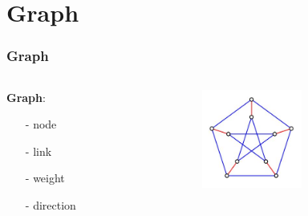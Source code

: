 \documentclass[notheorems,mathserif,table,compress]{beamer}  %
\begin{document}
\section{Graph}
\begin{frame}
    \frametitle{Graph}
    \begin{columns}
       \begin{column}[c]{0.5\textwidth}
          {\textbf{\Large Graph}}:\\
          \begin{itemize}
	  \item[-] node
	  \item[-] link
	  \item[-] weight
	  \item[-] direction
          \end{itemize}
      \end{column}
  
      \begin{column}[c]{0.5\textwidth}
          \begin{figure}[!ht]
          \centering
          \includegraphics[width=1.3in]{graph_origin.png}
          \end{figure}
     \end{column}
   \end{columns}
\end{frame}
\end{document}
